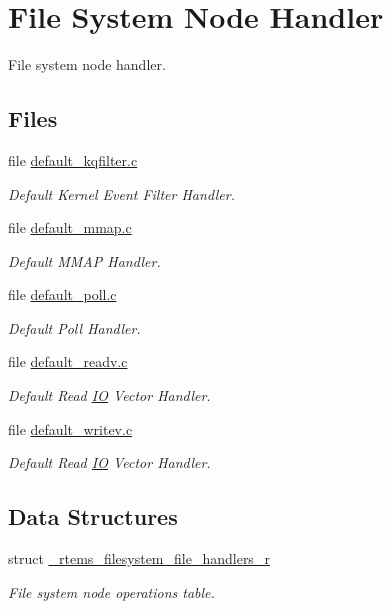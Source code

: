 \hypertarget{group__LibIOFSHandler}{}\section{File System Node Handler}
\label{group__LibIOFSHandler}


File system node handler.  


\subsection*{Files}
\begin{DoxyCompactItemize}
\item 
file \mbox{\hyperlink{default__kqfilter_8c}{default\+\_\+kqfilter.\+c}}
\begin{DoxyCompactList}\small\item\em Default Kernel Event Filter Handler. \end{DoxyCompactList}\item 
file \mbox{\hyperlink{default__mmap_8c}{default\+\_\+mmap.\+c}}
\begin{DoxyCompactList}\small\item\em Default M\+M\+AP Handler. \end{DoxyCompactList}\item 
file \mbox{\hyperlink{default__poll_8c}{default\+\_\+poll.\+c}}
\begin{DoxyCompactList}\small\item\em Default Poll Handler. \end{DoxyCompactList}\item 
file \mbox{\hyperlink{default__readv_8c}{default\+\_\+readv.\+c}}
\begin{DoxyCompactList}\small\item\em Default Read \mbox{\hyperlink{structIO}{IO}} Vector Handler. \end{DoxyCompactList}\item 
file \mbox{\hyperlink{default__writev_8c}{default\+\_\+writev.\+c}}
\begin{DoxyCompactList}\small\item\em Default Read \mbox{\hyperlink{structIO}{IO}} Vector Handler. \end{DoxyCompactList}\end{DoxyCompactItemize}
\subsection*{Data Structures}
\begin{DoxyCompactItemize}
\item 
struct \mbox{\hyperlink{struct__rtems__filesystem__file__handlers__r}{\+\_\+rtems\+\_\+filesystem\+\_\+file\+\_\+handlers\+\_\+r}}
\begin{DoxyCompactList}\small\item\em File system node operations table. \end{DoxyCompactList}\end{DoxyCompactItemize}
